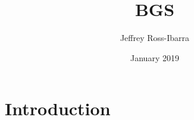 \documentclass{article}
\title{BGS}
\author{Jeffrey Ross-Ibarra}
\date{January 2019}
\begin{document}
\maketitle

\section{Introduction}
\end{document}
